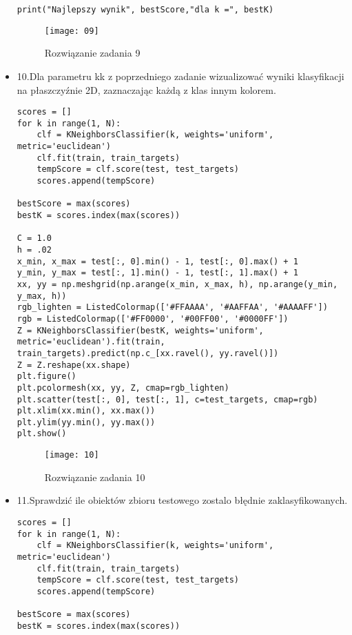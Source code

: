 \documentclass[12pt,a4paper]{article}
\begin{document}
\begin{itemize}
\begin{lstlisting}
print("Najlepszy wynik", bestScore,"dla k =", bestK)
	\end{lstlisting}
		\begin{figure}[h]
                        \texttt{[image: 09]}
                        \centering
			\caption{Rozwiązanie zadania 9}
			\label{fig:fig9}
                \end{figure}
                \clearpage
                                       \item 10.Dla parametru kk z poprzedniego zadanie wizualizować wyniki klasyfikacji na płaszczyźnie 2D, zaznaczając każdą z klas innym kolorem.
	\begin{lstlisting}
scores = []
for k in range(1, N):
    clf = KNeighborsClassifier(k, weights='uniform', metric='euclidean')
    clf.fit(train, train_targets)
    tempScore = clf.score(test, test_targets)
    scores.append(tempScore)

bestScore = max(scores)
bestK = scores.index(max(scores))

C = 1.0
h = .02
x_min, x_max = test[:, 0].min() - 1, test[:, 0].max() + 1
y_min, y_max = test[:, 1].min() - 1, test[:, 1].max() + 1
xx, yy = np.meshgrid(np.arange(x_min, x_max, h), np.arange(y_min, y_max, h))
rgb_lighten = ListedColormap(['#FFAAAA', '#AAFFAA', '#AAAAFF'])
rgb = ListedColormap(['#FF0000', '#00FF00', '#0000FF'])
Z = KNeighborsClassifier(bestK, weights='uniform', metric='euclidean').fit(train, train_targets).predict(np.c_[xx.ravel(), yy.ravel()])
Z = Z.reshape(xx.shape)
plt.figure()
plt.pcolormesh(xx, yy, Z, cmap=rgb_lighten)
plt.scatter(test[:, 0], test[:, 1], c=test_targets, cmap=rgb)
plt.xlim(xx.min(), xx.max())
plt.ylim(yy.min(), yy.max())
plt.show()
	\end{lstlisting}
		\begin{figure}[h]
                        \texttt{[image: 10]}
                        \centering
			\caption{Rozwiązanie zadania 10}
			\label{fig:fig10}
                \end{figure}
                \clearpage
\item 11.Sprawdzić ile obiektów zbioru testowego zostalo błędnie zaklasyfikowanych.
	\begin{lstlisting}
scores = []
for k in range(1, N):
    clf = KNeighborsClassifier(k, weights='uniform', metric='euclidean')
    clf.fit(train, train_targets)
    tempScore = clf.score(test, test_targets)
    scores.append(tempScore)

bestScore = max(scores)
bestK = scores.index(max(scores))


\end{lstlisting}
\end{itemize}
\end{document}
